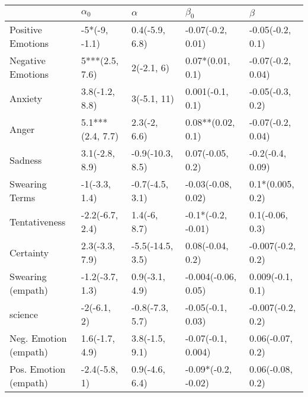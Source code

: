 \begin{tabular}{lllll}
\toprule
{} &        $\alpha_0$ &          $\alpha$ &            $\beta_0$ &            $\beta$ \\
\midrule
Positive Emotions     &     -5*(-9, -1.1) &    0.4(-5.9, 6.8) &    -0.07(-0.2, 0.01) &   -0.05(-0.2, 0.1) \\
Negative Emotions     &    5***(2.5, 7.6) &        2(-2.1, 6) &     0.07*(0.01, 0.1) &  -0.07(-0.2, 0.04) \\
Anxiety               &    3.8(-1.2, 8.8) &       3(-5.1, 11) &     0.001(-0.1, 0.1) &   -0.05(-0.3, 0.2) \\
Anger                 &  5.1***(2.4, 7.7) &      2.3(-2, 6.6) &    0.08**(0.02, 0.1) &  -0.07(-0.2, 0.04) \\
Sadness               &    3.1(-2.8, 8.9) &  -0.9(-10.3, 8.5) &     0.07(-0.05, 0.2) &   -0.2(-0.4, 0.09) \\
Swearing Terms        &     -1(-3.3, 1.4) &   -0.7(-4.5, 3.1) &   -0.03(-0.08, 0.02) &   0.1*(0.005, 0.2) \\
Tentativeness         &   -2.2(-6.7, 2.4) &      1.4(-6, 8.7) &   -0.1*(-0.2, -0.01) &    0.1(-0.06, 0.3) \\
Certainty             &    2.3(-3.3, 7.9) &  -5.5(-14.5, 3.5) &     0.08(-0.04, 0.2) &  -0.007(-0.2, 0.2) \\
Swearing (empath)     &   -1.2(-3.7, 1.3) &    0.9(-3.1, 4.9) &  -0.004(-0.06, 0.05) &   0.009(-0.1, 0.1) \\
science               &       -2(-6.1, 2) &   -0.8(-7.3, 5.7) &    -0.05(-0.1, 0.03) &  -0.007(-0.2, 0.2) \\
Neg. Emotion (empath) &    1.6(-1.7, 4.9) &    3.8(-1.5, 9.1) &   -0.07(-0.1, 0.004) &   0.06(-0.07, 0.2) \\
Pos. Emotion (empath) &     -2.4(-5.8, 1) &    0.9(-4.6, 6.4) &  -0.09*(-0.2, -0.02) &   0.06(-0.08, 0.2) \\
\bottomrule
\end{tabular}
